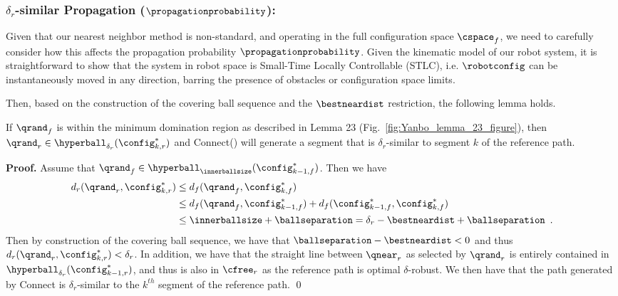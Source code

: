 \subsubsection{$\delta_r$-similar Propagation ($\propagationprobability$):}
\label{sec:prop}
Given that our nearest neighbor method is non-standard, and operating in the full configuration space $\cspace_f$, we need to carefully consider how this affects the propagation probability $\propagationprobability$. Given the kinematic model of our robot system, it is straightforward to show that the system in robot space is Small-Time Locally Controllable (STLC), i.e. $\robotconfig$ can be instantaneously moved in any direction, barring the presence of obstacles or configuration space limits.  

Then, based on the construction of the covering ball sequence and the $\bestneardist$ restriction, the following lemma holds.

\begin{lemma}
    \label{lem:rand_to_next_dist}
    If $\qrand_f$ is within the minimum domination region as described in \cite{LiAOKP2016} Lemma 23 (Fig.~\ref{fig:Yanbo_lemma_23_figure}), then $\qrand_r \in \hyperball_{\delta_r}(\config^*_{k, r})$ and Connect() will generate a segment that is $\delta_r$-similar to segment $k$ of the reference path.
\end{lemma}



\noindent
{\bf Proof.}
Assume that $\qrand_f \in \hyperball_{\innerballsize}(\config^*_{k-1,f})$. Then we have
\begin{align*}
    d_r(\qrand_r, \config^*_{k,r}) &\leq d_f(\qrand_f, \config^*_{k,f}) \\
                                   &\leq d_f(\qrand_f, \config^*_{k-1,f}) + d_f(\config^*_{k-1,f}, \config^*_{k,f}) \\
                                   &\leq \innerballsize + \ballseparation = \delta_r - \bestneardist + \ballseparation \enspace.
\end{align*}
Then by construction of the covering ball sequence, we have that $\ballseparation -\bestneardist < 0$ and thus $d_r(\qrand_r, \config^*_{k,r}) < \delta_r$. In addition, we have that the straight line between $\qnear_r$ as selected by $\qrand_r$ is entirely contained in $\hyperball_{\delta_r}(\config^*_{k-1,r})$, and thus is also in $\cfree_r$ as the reference path is optimal $\delta$-robust. We then have that the path generated by Connect is $\delta_r$-similar to the $k^{th}$ segment of the reference path.
\qed

